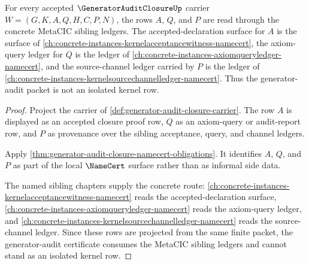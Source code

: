 \begin{theorem}
\label{thm:generator-audit-closure-metacic-sibling-route}
For every accepted $\GeneratorAuditClosureUp$ carrier $W=(G,K,A,Q,H,C,P,N)$, the rows $A$, $Q$, and $P$ are read through the concrete MetaCIC sibling ledgers. The accepted-declaration surface for $A$ is the surface of \autoref{ch:concrete-instances-kernelacceptancewitness-namecert}, the axiom-query ledger for $Q$ is the ledger of \autoref{ch:concrete-instances-axiomqueryledger-namecert}, and the source-channel ledger carried by $P$ is the ledger of \autoref{ch:concrete-instances-kernelsourcechannelledger-namecert}. Thus the generator-audit packet is not an isolated kernel row.
\end{theorem}
\begin{proof}
Project the carrier of \autoref{def:generator-audit-closure-carrier}. The row $A$ is displayed as an accepted closure proof row, $Q$ as an axiom-query or audit-report row, and $P$ as provenance over the sibling acceptance, query, and channel ledgers.

Apply \autoref{thm:generator-audit-closure-namecert-obligations}. It identifies $A$, $Q$, and $P$ as part of the local $\NameCert$ surface rather than as informal side data.

The named sibling chapters supply the concrete route: \autoref{ch:concrete-instances-kernelacceptancewitness-namecert} reads the accepted-declaration surface, \autoref{ch:concrete-instances-axiomqueryledger-namecert} reads the axiom-query ledger, and \autoref{ch:concrete-instances-kernelsourcechannelledger-namecert} reads the source-channel ledger. Since these rows are projected from the same finite packet, the generator-audit certificate consumes the MetaCIC sibling ledgers and cannot stand as an isolated kernel row.
\end{proof}

